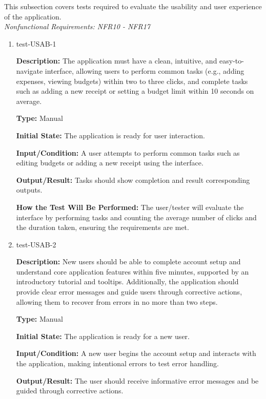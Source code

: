 \documentclass[12pt, titlepage]{article}
\begin{document}
This subsection covers tests required to evaluate the usability and user experience of the application. \\
\textit{Nonfunctional Requirements: NFR10 - NFR17}

\begin{enumerate}

\item{test-USAB-1\\}

\textbf{Description:} The application must have a clean, intuitive, and easy-to-navigate interface, allowing users to perform common tasks (e.g., adding expenses, viewing budgets) within two to three clicks, and complete tasks such as adding a new receipt or setting a budget limit within 10 seconds on average.

\textbf{Type:} Manual
					
\textbf{Initial State:} The application is ready for user interaction.
					
\textbf{Input/Condition:} A user attempts to perform common tasks such as editing budgets or adding a new receipt using the interface.
					
\textbf{Output/Result:} Tasks should show completion and result corresponding outputs.
					
\textbf{How the Test Will Be Performed:} The user/tester will evaluate the interface by performing tasks and counting the average number of clicks and the duration taken, ensuring the requirements are met.

\item{test-USAB-2\\}

\textbf{Description:} New users should be able to complete account setup and understand core application features within five minutes, supported by an introductory tutorial and tooltips. Additionally, the application should provide clear error messages and guide users through corrective actions, allowing them to recover from errors in no more than two steps.

\textbf{Type:} Manual
					
\textbf{Initial State:} The application is ready for a new user.
					
\textbf{Input/Condition:} A new user begins the account setup and interacts with the application, making intentional errors to test error handling.
					
\textbf{Output/Result:} The user should receive informative error messages and be guided through corrective actions.
					

\end{enumerate}
\end{document}

